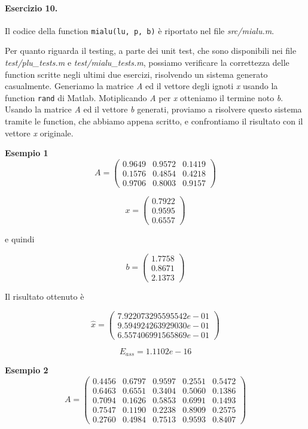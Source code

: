 \paragraph{Esercizio 10.} Il codice della function \verb|mialu(lu, p, b)| è riportato nel file \emph{src/mialu.m}.

Per quanto riguarda il testing, a parte dei unit test, che sono disponibili nei file \emph{test/plu\_tests.m} e \emph{test/mialu\_tests.m}, possiamo verificare la correttezza delle function scritte negli ultimi due esercizi, risolvendo un sistema generato casualmente. Generiamo la matrice \emph{A} ed il vettore degli ignoti \emph{x} usando la function \verb|rand| di Matlab. Motiplicando \emph{A} per \emph{x} otteniamo il termine noto \emph{b}. Usando la matrice \emph{A} ed il vettore \emph{b} generati, proviamo a risolvere questo sistema tramite le function, che abbiamo appena scritto, e confrontiamo il risultato con il vettore \emph{x} originale.

\textbf{Esempio 1}
\[
A = \begin{pmatrix}
0.9649 & 0.9572 & 0.1419\\
0.1576 & 0.4854 & 0.4218\\
0.9706 & 0.8003 & 0.9157
\end{pmatrix}
\]

\[
x = \begin{pmatrix}
0.7922\\
0.9595\\
0.6557
\end{pmatrix}
\]

e quindi

\[
b = \begin{pmatrix}
1.7758\\
0.8671\\
2.1373
\end{pmatrix}
\]

Il risultato ottenuto è

\[
\hat{x} = \begin{pmatrix}
7.922073295595542e-01\\
9.594924263929030e-01\\
6.557406991565869e-01
\end{pmatrix}
\]

\[
E_{ass} = 1.1102e-16
\]

\textbf{Esempio 2}
\[
A = \begin{pmatrix}
0.4456 & 0.6797 & 0.9597 & 0.2551 & 0.5472\\
0.6463 & 0.6551 & 0.3404 & 0.5060 & 0.1386\\
0.7094 & 0.1626 & 0.5853 & 0.6991 & 0.1493\\
0.7547 & 0.1190 & 0.2238 & 0.8909 & 0.2575\\
0.2760 & 0.4984 & 0.7513 & 0.9593 & 0.8407
\end{pmatrix}
\]

